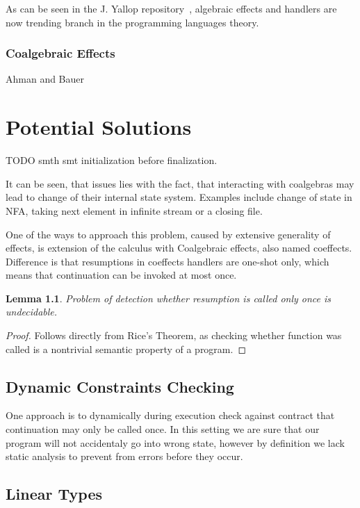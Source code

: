\documentclass[declaration,shortabstract]{iithesis}
\theoremstyle{definition} \newtheorem{definition}{Definition}[chapter]
\theoremstyle{remark} \newtheorem{remark}[definition]{Observation}
\theoremstyle{plain} \newtheorem{theorem}[definition]{Theorem}
\theoremstyle{plain} \newtheorem{lemma}[definition]{Lemma}
\begin{document}
    As can be seen in the J. Yallop repository~\cite{effects-bibliography}, algebraic
    effects and handlers are now trending branch in the programming languages theory.

    \subsection{Coalgebraic Effects}

    Ahman and Bauer~\cite{runners-in-action}


\chapter{Potential Solutions}

TODO smth smt initialization before finalization.

It can be seen, that issues lies with the fact, that interacting with coalgebras
may lead to change of their internal state system. Examples include change
of state in NFA, taking next element in infinite stream or a closing file.

One of the ways to approach this problem, caused by extensive generality of
effects, is extension of the calculus with Coalgebraic effects, also named
coeffects. Difference is that resumptions in coeffects handlers are one-shot
only, which means that continuation can be invoked at most once.

\begin{lemma}
    Problem of detection whether resumption is called only once is undecidable.
\end{lemma}

\begin{proof}
    Follows directly from Rice's Theorem, as checking whether function was called
    is a nontrivial semantic property of a program.
\end{proof}


\section{Dynamic Constraints Checking}

One approach is to dynamically during execution check against contract that
continuation may only be called once. In this setting we are sure that our
program will not accidentaly go into wrong state, however by definition we lack
static analysis to prevent from errors before they occur.

\section{Linear Types}
\end{document}
